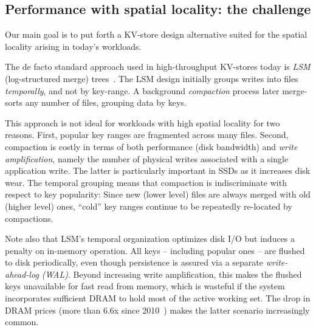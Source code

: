 \subsection{Performance with spatial locality: the challenge }  

Our main goal is to 
put forth a KV-store design alternative  suited for the 
spatial locality arising in today's  workloads. 


The de facto standard approach used in high-throughput KV-stores today is \emph{LSM} (log-structured merge) trees~\cite{DBLP:journals/acta/ONeilCGO96}. 
The LSM design initially groups writes  into files \emph{temporally}, and not by key-range. 
A background \emph{compaction} process later merge-sorts any number of files, grouping data by keys. 

This approach is not ideal for workloads with high spatial locality for two reasons. 
First,  popular key ranges are fragmented across many files. 
Second,  compaction  is costly in terms of  both performance 
(disk bandwidth) and \emph{write amplification}, namely the number of physical writes 
associated with a single application write. The latter is  particularly important in SSDs as it increases disk wear. 
The temporal grouping means that compaction is indiscriminate with respect to key popularity:  
Since new (lower level) files are always merged with old (higher level) ones, 
 ``cold'' key ranges  continue to be repeatedly re-located by  compactions.  

Note also that LSM's temporal  organization optimizes disk I/O but induces a penalty on in-memory operation. 
All keys -- including popular ones -- are flushed to disk periodically, even though persistence is assured via a separate \emph{write-ahead-log (WAL)}.
Beyond increasing write amplification, this makes the flushed keys unavailable for fast read from memory,
which is  wasteful if the system incorporates sufficient DRAM to hold most of the active working set. 
The drop in DRAM prices (more than $6.6$x since 2010~\cite{dram-prices}) makes the latter scenario increasingly common.  

